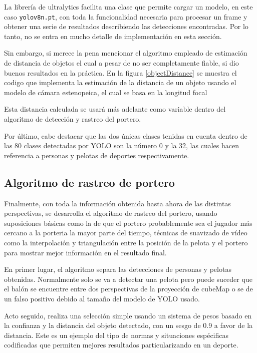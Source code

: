 La librería de ultralytics facilita una clase que permite cargar un modelo, en este caso \verb|yolov8n.pt|, con toda la funcionalidad necesaria para procesar un frame y obtener una serie de resultados describiendo las detecciones encontradas. Por lo tanto, no se entra en mucho detalle de implementación en esta sección.

Sin embargo, si merece la pena mencionar el algoritmo empleado de estimación de distancia de objetos el cual a pesar de no ser completamente fiable, si dio buenos resultados en la práctica. En la figura \ref{objectDistance} se muestra el codigo que implementa la estimación de la distancia de un objeto usando el modelo de cámara estenopeica, el cual se basa en la longitud focal


Esta distancia calculada se usará más adelante como variable dentro del algoritmo de detección y rastreo del portero.

Por último, cabe destacar que las dos únicas clases tenidas en cuenta dentro de las 80 clases detectadas por YOLO son la número 0 y la 32, las cuales hacen referencia a personas y pelotas de deportes respectivamente.

\subsection{Algoritmo de rastreo de portero}
Finalmente, con toda la información obtenida hasta ahora de las distintas perspectivas, se desarrolla el algoritmo de rastreo del portero, usando suposiciones básicas como la de que el portero probablemente sea el jugador más cercano a la porteria la mayor parte del tiempo, técnicas de suavizado de vídeo como la interpolación y triangulación entre la posición de la pelota y el portero para mostrar mejor información en el resultado final.

En primer lugar, el algoritmo separa las detecciones de personas y pelotas obtenidas. Normalmente solo se va a detectar una pelota pero puede suceder que el balón se encuentre entre dos perspectivas de la proyección de cubeMap o se de un falso positivo debido al tamaño del modelo de YOLO usado.

Acto seguido, realiza una selección simple usando un sistema de pesos basado en la confianza y la distancia del objeto detectado, con un sesgo de 0.9 a favor de la distancia. Este es un ejemplo del tipo de normas y situaciones espécificas codificadas que permiten mejores resultados particularizando en un deporte.

